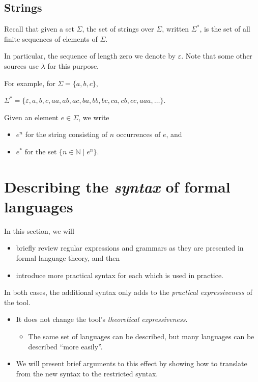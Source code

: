 \documentclass[11pt]{article}
\theoremstyle{definition}
\begin{document}
\subsection{Strings}
\label{sec:orgfc56593}

Recall that given a set \(Σ\), the set of strings over \(Σ\),
written \(Σ^{*}\), is the set of all finite sequences
of elements of \(Σ\).

In particular, the sequence of length zero we denote by \(ε\).
Note that some other sources use \(λ\) for this purpose.

For example, for \(Σ = \{a, b, c\}\),
\begin{center}
\(Σ^{*} = \{ε, a, b, c, aa, ab, ac, ba, bb, bc, ca, cb, cc, aaa, …\}\).
\end{center}

Given an element \(e ∈ Σ\), we write
\begin{itemize}
\item \(e^{n}\) for the string consisting of \(n\) occurrences of \(e\), and
\item \(e^{*}\) for the set \(\{ n ∈ ℕ ∣ e^{n} \}\).
\end{itemize}

\section{Describing the \emph{syntax} of formal languages}
\label{sec:org0225aaf}

In this section, we will
\begin{itemize}
\item briefly review regular expressions and grammars as
they are presented in formal language theory, and then
\item introduce more practical syntax for each
which is used in practice.
\end{itemize}

In both cases, the additional syntax only adds to
the \emph{practical expressiveness} of the tool.
\begin{itemize}
\item It does not change the tool's \emph{theoretical expressiveness}.
\begin{itemize}
\item The same set of languages can be described,
but many languages can be described “more easily”.
\end{itemize}
\item We will present brief arguments to this effect
by showing how to translate from the new syntax
to the restricted syntax.
\end{itemize}
\end{document}
